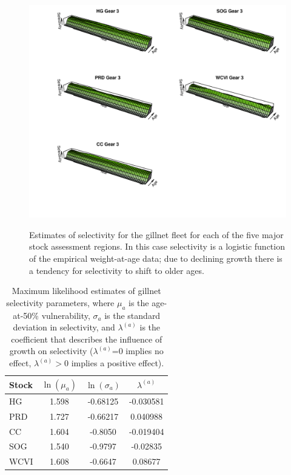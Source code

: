 \begin{figure}[!tbp]
	\includegraphics[width=\textwidth]{../FIGS/qPriorFigs/iscam_fig_gill_net_selectivity.pdf}\\
	\caption{Estimates of selectivity for the gillnet fleet for each of the five major stock assessment regions. In this case selectivity is a logistic function of the empirical weight-at-age data; due to declining growth there is a tendency for selectivity to shift to older ages.}\label{PartII:Results:figGillNetSel}
\end{figure}


\begin{table}[htdp]
\caption{Maximum likelihood estimates of gillnet selectivity parameters, where $\mu_a$ is the age-at-50\% vulnerability, $\sigma_a$ is the standard deviation in selectivity, and $\lambda^{(a)}$ is the coefficient that describes the influence of growth on selectivity ($\lambda^{(a)}$=0 implies no effect, $\lambda^{(a)}>0$ implies a positive effect).}
\begin{center}
\begin{tabular}{lccc}
\hline
Stock 	& $\ln(\mu_a)$ 	& $\ln(\sigma_a)$	& $\lambda^{(a)}$ \\
\hline
HG		&	 1.598		&	-0.68125		&	-0.030581	\\
PRD		&    1.727		&   -0.66217		&    0.040988 \\
CC		&    1.604 		&   -0.8050        &   -0.019404\\
SOG		&	 1.540		&   -0.9797			&   -0.02835\\
WCVI	& 	 1.608		&   -0.6647			& 	 0.08677\\
\hline
\end{tabular}
\end{center}
\label{PartII:Table:GN_Sel_par}
\end{table}%


